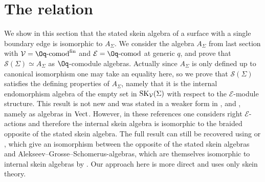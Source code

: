 \section{The relation}\label{SectRelation}
We show in this section that the stated skein algebra of a surface with a single boundary edge is isomorphic to $A_\Sigma$. We consider the algebra $A_\Sigma$ from last section with $\mathcal{V} = \Oq\text{-}{\rm comod}^{\rm fin}$ and $\mathcal{E} = \Oq\text{-}{\rm comod}$ at generic $q$, and prove that $\mathscr{S}(\Sigma)\simeq A_\Sigma$ as $\Oq$-comodule algebras. Actually since $A_\Sigma$ is only defined up to canonical isomorphism one may take an equality here, so we prove that $\mathscr{S}(\Sigma)$ satisfies the defining properties of $A_\Sigma$, namely that it is the internal endomorphism algebra of the empty set in ${\rm SK}_\mathcal{V}(\Sigma)$ with respect to the $\mathcal{E}$-module structure. This result is not new and was stated in a weaker form in \cite[Theorem~4.4]{LeYu}, \cite[Theorem~9.1]{LeSikora} and \cite[Remark 2.21]{Gunningham}, namely as algebras in $\rm Vect$. However, in these references one considers right $\mathcal{E}$-actions and therefore the internal skein algebra is isomorphic to the braided opposite of the stated skein algebra. The full result can still be recovered using \cite[Theorem~5.3]{Faitg} or \cite{Korinman}, which give an isomorphism between the opposite of the stated skein algebras and Alekseev--Grosse--Schomerus-algebras, which are themselves isomorphic to internal skein algebras by \cite{BBJ}. Our approach here is more direct and uses only skein theory.

